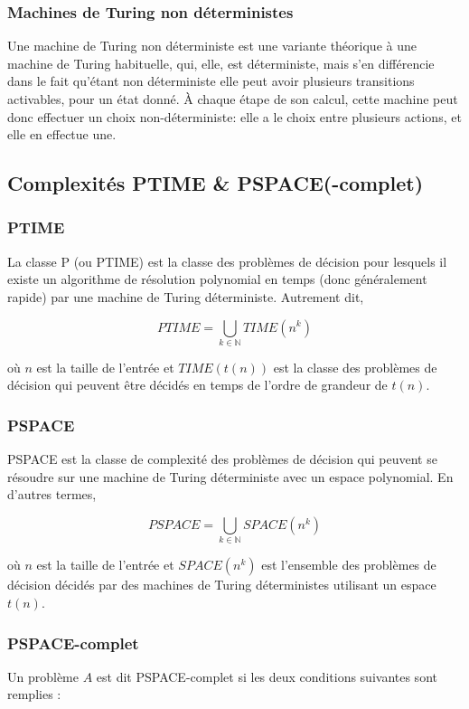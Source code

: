 \documentclass[runningheads,a4paper,10pt]{llncs}
\begin{document}
\begin{subappendices}
\subsubsection{Machines de Turing non déterministes}
Une machine de Turing non déterministe est une variante théorique à une machine de Turing habituelle, qui, elle, est déterministe, mais s'en différencie dans le fait qu'étant non déterministe elle peut avoir plusieurs transitions activables, pour un état donné. À chaque étape de son calcul, cette machine peut donc effectuer un choix non-déterministe: elle a le choix entre plusieurs actions, et elle en effectue une. 

\subsection{Complexités PTIME \& PSPACE(-complet)}

\subsubsection{PTIME}
La classe P (ou PTIME) est la classe des problèmes de décision pour lesquels il existe un algorithme de résolution polynomial en temps (donc généralement rapide) par une
machine de Turing déterministe. Autrement dit, 

$$ PTIME = \bigcup_{k \in \mathbb{N}} TIME(n^{k}) $$

où $n$ est la taille de l'entrée et $TIME(t(n))$ est la classe des problèmes de décision qui peuvent être décidés en temps de l'ordre de grandeur de $t(n)$.

\subsubsection{PSPACE} 
PSPACE est la classe de complexité des problèmes de décision qui peuvent se résoudre sur une machine de Turing déterministe avec un espace polynomial. En d’autres termes, 

$$ PSPACE = \bigcup_{k \in \mathbb{N}} SPACE(n^{k}) $$

où $n$ est la taille de l'entrée et $SPACE(n^{k})$ est l'ensemble des problèmes de décision décidés par des machines de Turing déterministes utilisant un espace $t(n)$.

\subsubsection{PSPACE-complet}
Un problème $A$ est dit PSPACE-complet si les deux conditions suivantes sont remplies : 


\end{subappendices}
\end{document}
